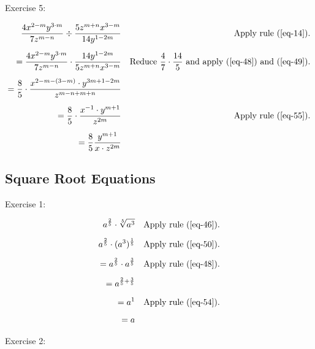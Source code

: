 Exercise 5:

\begin{align*}
    \frac{4x^{2-m}y^{3\cdot m}}{7z^{m-n}} \div \frac{5z^{m+n}x^{3-m}}{14y^{1-2m}}&&\text{Apply rule \bref{eq-14}.}&\\[1.25ex]
    = \frac{4x^{2-m}y^{3\cdot m}}{7z^{m-n}} \cdot \frac{14y^{1-2m}}{5z^{m+n}x^{3-m}}&&\text{Reduce $\frac{4}{7} \cdot \frac{14}{5}$ and apply \bref{eq-48} and \bref{eq-49}.}&\\[1.25ex]
    = \frac{8}{5}\cdot \frac{x^{2-m-(3-m)}\cdot y^{3m+1-2m}}{z^{m-n+m+n}}&\\[1.25ex]
    = \frac{8}{5}\cdot \frac{x^{-1}\cdot y^{m+1}}{z^{2m}}&&\text{Apply rule \bref{eq-55}.}&\\[1.25ex]
    = \frac{8}{5} \frac{y^{m+1}}{x\cdot z^{2m}}&
\end{align*}

\newpage


\vspace{0.5cm}\subsection{Square Root Equations}

\vspace{0.5cm}Exercise 1:

\begin{align*}
    a^{\frac{2}{5}} \cdot \sqrt[5]{a^3} &&\text{Apply rule \bref{eq-46}.}&\\[1.25ex]
    a^{\frac{2}{5}} \cdot (a^3)^{\frac{1}{5}} &&\text{Apply rule \bref{eq-50}.}&\\[1.25ex]
    = a^{\frac{2}{5}} \cdot a^{\frac{3}{5}} &&\text{Apply rule \bref{eq-48}.}&\\[1.25ex]
    = a^{\frac{2}{5} + \frac{3}{5}}&\\[1.25ex]
    = a^1 &&\text{Apply rule \bref{eq-54}.}&\\[1.25ex]
    = a &
\end{align*}

Exercise 2:

